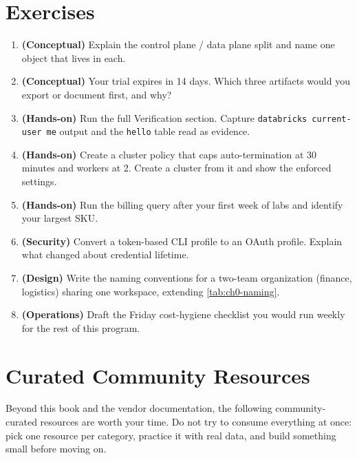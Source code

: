 \section{Exercises}
\begin{enumerate}
    \item \textbf{(Conceptual)} Explain the control plane / data plane split and name one object that lives in each.
    \item \textbf{(Conceptual)} Your trial expires in 14 days. Which three artifacts would you export or document first, and why?
    \item \textbf{(Hands-on)} Run the full Verification section. Capture \texttt{databricks current-user me} output and the \texttt{hello} table read as evidence.
    \item \textbf{(Hands-on)} Create a cluster policy that caps auto-termination at 30 minutes and workers at 2. Create a cluster from it and show the enforced settings.
    \item \textbf{(Hands-on)} Run the billing query after your first week of labs and identify your largest SKU.
    \item \textbf{(Security)} Convert a token-based CLI profile to an OAuth profile. Explain what changed about credential lifetime.
    \item \textbf{(Design)} Write the naming conventions for a two-team organization (finance, logistics) sharing one workspace, extending \cref{tab:ch0-naming}.
    \item \textbf{(Operations)} Draft the Friday cost-hygiene checklist you would run weekly for the rest of this program.
\end{enumerate}

\section{Curated Community Resources}
%
Beyond this book and the vendor documentation, the following community-curated resources are worth your time. Do not try to consume everything at once: pick one resource per category, practice it with real data, and build something small before moving on.

